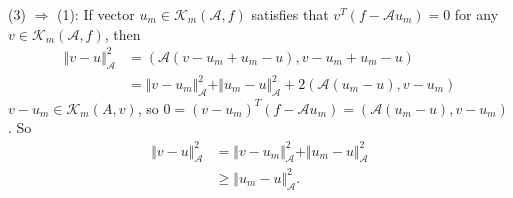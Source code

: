 \documentclass{article}
\begin{document}
(3) $\Rightarrow$ (1):
If vector $u_m\in\mathcal{K}_m(\mathcal{A},f)$  satisfies that $v^T( f-\mathcal{A}u_m)=0$  for any $v\in \mathcal{K}_m(\mathcal{A},f)$, then
\begin{equation*}
    \begin{aligned}
        \Vert v-u\Vert_\mathcal{A}^2
         & =(\mathcal{A}(v-u_m+u_m-u),v-u_m+u_m-u)                                                    \\
         & =\Vert v-u_m\Vert_\mathcal{A}^2+\Vert u_m-u\Vert_\mathcal{A}^2+2(\mathcal{A}(u_m-u),v-u_m)
    \end{aligned}
\end{equation*}
$v-u_m\in\mathcal{K}_m(A,v)$, so $0=(v-u_m)^T(f-\mathcal{A}u_m)=(\mathcal{A}(u_m-u),v-u_m)$. So
\begin{equation*}
    \begin{aligned}
        \Vert v-u\Vert_\mathcal{A}^2
         & =\Vert v-u_m\Vert_\mathcal{A}^2+\Vert u_m-u\Vert_\mathcal{A}^2 \\
         & \geqslant \Vert u_m-u\Vert_\mathcal{A}^2 .
    \end{aligned}
\end{equation*}
\end{document}
